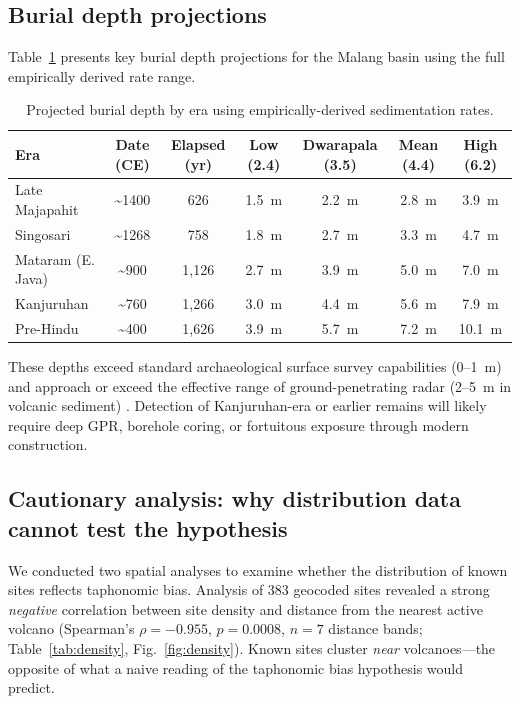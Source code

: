 \documentclass[12pt,a4paper]{article}
\begin{document}
\subsection{Burial depth projections}

Table~\ref{tab:depth} presents key burial depth projections for the Malang basin using the full empirically derived rate range.

\begin{table}[t]
\caption{Projected burial depth by era using empirically-derived sedimentation rates.}
\label{tab:depth}
\begin{tabular}{lcccccc}
\toprule
Era & Date (CE) & Elapsed (yr) & Low (2.4) & Dwarapala (3.5) & Mean (4.4) & High (6.2) \\
\midrule
Late Majapahit & \textasciitilde1400 & 626 & 1.5~m & 2.2~m & 2.8~m & 3.9~m \\
Singosari & \textasciitilde1268 & 758 & 1.8~m & 2.7~m & 3.3~m & 4.7~m \\
Mataram (E. Java) & \textasciitilde900 & 1,126 & 2.7~m & 3.9~m & 5.0~m & 7.0~m \\
Kanjuruhan & \textasciitilde760 & 1,266 & 3.0~m & 4.4~m & 5.6~m & 7.9~m \\
Pre-Hindu & \textasciitilde400 & 1,626 & 3.9~m & 5.7~m & 7.2~m & 10.1~m \\
\bottomrule
\end{tabular}
\end{table}

These depths exceed standard archaeological surface survey capabilities (0--1~m) and approach or exceed the effective range of ground-penetrating radar (2--5~m in volcanic sediment) \citep{conyers2004,goodman2013}. Detection of Kanjuruhan-era or earlier remains will likely require deep GPR, borehole coring, or fortuitous exposure through modern construction.

\subsection{Cautionary analysis: why distribution data cannot test the hypothesis}

We conducted two spatial analyses to examine whether the distribution of known sites reflects taphonomic bias. Analysis of 383 geocoded sites revealed a strong \textit{negative} correlation between site density and distance from the nearest active volcano (Spearman's $\rho = -0.955$, $p = 0.0008$, $n = 7$ distance bands; Table~\ref{tab:density}, Fig.~\ref{fig:density}). Known sites cluster \textit{near} volcanoes---the opposite of what a naive reading of the taphonomic bias hypothesis would predict.
\end{document}
